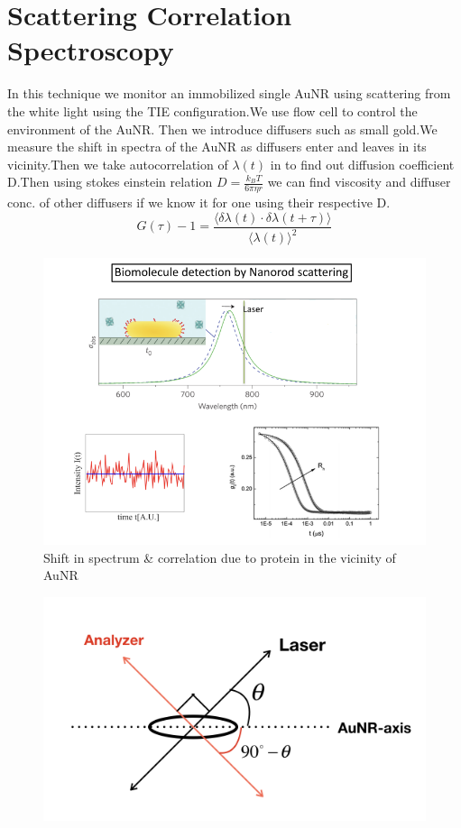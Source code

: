 \documentclass[twoside,single]{lion-msc}
\begin{document}
\section{Scattering Correlation Spectroscopy}
In this technique\cite{AuNR1} we monitor an immobilized single AuNR using scattering from the white light using the TIE configuration.We use flow cell to control the environment of the AuNR. Then we introduce diffusers such as small gold.We measure the shift in spectra of the AuNR as diffusers enter and leaves in its vicinity.Then we take autocorrelation of $\lambda(t)$ in to find out diffusion coefficient D.Then using stokes einstein relation $ D = \frac{k_B{T}}{6\pi\eta{r}}$ we can find viscosity and diffuser conc. of other diffusers if we know it for one using their respective D.
$$
G(\tau) -1= \frac{\langle\delta\lambda(t) \cdot\delta\lambda(t+\tau) \rangle}{\langle{\lambda(t)}\rangle^2}
$$
\begin{figure}[H]
\includegraphics[width=1\textwidth,left]{13}
Shift in spectrum \& correlation due to protein in the vicinity of AuNR\cite{AuNR4}
\end{figure}

\begin{figure}[H]
\includegraphics[width=1\textwidth,left]{9}
\end{figure}
\end{document}
